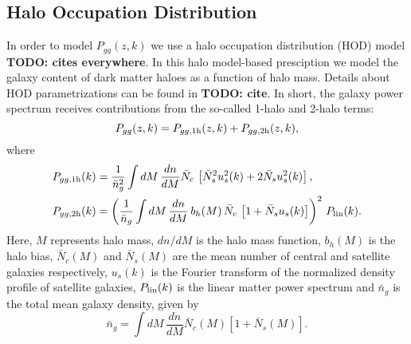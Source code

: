\documentclass[a4paper,11pt]{article}
\newcommand{\todo}[1]{{\bf TODO: #1}}
\begin{document}
  \subsection{Halo Occupation Distribution}\label{ssec:theory.hod}
    In order to model $P_{gg}(z,k)$ we use a halo occupation distribution (HOD) model \todo{cites everywhere}. In this halo model-based presciption we model the galaxy content of dark matter haloes as a function of halo mass. Details about HOD parametrizations can be found in \todo{cite}. In short, the galaxy power spectrum receives contributions from the so-called 1-halo and 2-halo terms:
    \begin{equation}
      P_{gg}(z,k) = P_{gg,{\rm 1h}}(z,k) + P_{gg,{\rm 2h}}(z,k),
    \end{equation}
    where
    \begin{align}
      & P_{gg,{\rm 1h}}(k)=\frac{1}{\bar{n}_g^2} \int dM\,\frac{dn}{dM} \bar{N}_c\,\left[\bar{N}_s^2u_s^2(k)+2\bar{N}_su_s^2(k)\right],\\
      & P_{gg,{\rm 2h}}(k)=\left(\frac{1}{\bar{n}_g} \int dM\,\frac{dn}{dM}\,b_h(M)\,\bar{N}_c\,\left[1+\bar{N}_su_s(k)\right]\right)^2\,P_{\rm lin}(k).
    \end{align}
    Here, $M$ represents halo mass, $dn/dM$ is the halo mass function, $b_h(M)$ is the halo bias, $\bar{N}_c(M)$ and $\bar{N}_s(M)$ are the mean number of central and satellite galaxies respectively, $u_s(k)$ is the Fourier transform of the normalized density profile of satellite galaxies, $P_{\rm lin}(k)$ is the linear matter power spectrum and $\bar{n}_g$ is the total mean galaxy density, given by
    \begin{equation}
      \bar{n}_g=\int dM\,\frac{dn}{dM}\bar{N}_c(M)\left[1+\bar{N}_s(M)\right].
    \end{equation}
\end{document}
